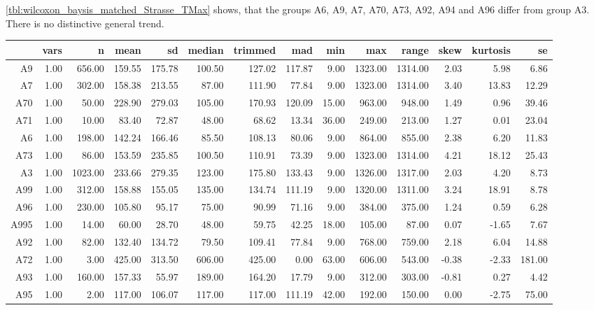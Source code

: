\cref{tbl:wilcoxon_baysis_matched_Strasse_TMax} shows, that the groups A6, A9, A7, A70, A73, A92, A94 and A96 differ from group A3. There is no distinctive general trend.
\begin{table}[ht!]
	\tiny
	\centering
  \begin{tabular}{rrrrrrrrrrrrrr}
    \toprule
    & vars & n & mean & sd & median & trimmed & mad & min & max & range & skew & kurtosis & se \\ 
    \midrule
    A9   & 1.00 & 656.00 & 159.55 & 175.78 & 100.50 & 127.02 & 117.87 & 9.00 & 1323.00 & 1314.00 & 2.03 & 5.98 & 6.86 \\ 
    A7   & 1.00 & 302.00 & 158.38 & 213.55 & 87.00 & 111.90 & 77.84 & 9.00 & 1323.00 & 1314.00 & 3.40 & 13.83 & 12.29 \\ 
    A70  & 1.00 & 50.00 & 228.90 & 279.03 & 105.00 & 170.93 & 120.09 & 15.00 & 963.00 & 948.00 & 1.49 & 0.96 & 39.46 \\ 
    A71  & 1.00 & 10.00 & 83.40 & 72.87 & 48.00 & 68.62 & 13.34 & 36.00 & 249.00 & 213.00 & 1.27 & 0.01 & 23.04 \\ 
    A6   & 1.00 & 198.00 & 142.24 & 166.46 & 85.50 & 108.13 & 80.06 & 9.00 & 864.00 & 855.00 & 2.38 & 6.20 & 11.83 \\ 
    A73  & 1.00 & 86.00 & 153.59 & 235.85 & 100.50 & 110.91 & 73.39 & 9.00 & 1323.00 & 1314.00 & 4.21 & 18.12 & 25.43 \\ 
    A3   & 1.00 & 1023.00 & 233.66 & 279.35 & 123.00 & 175.80 & 133.43 & 9.00 & 1326.00 & 1317.00 & 2.03 & 4.20 & 8.73 \\ 
    A99  & 1.00 & 312.00 & 158.88 & 155.05 & 135.00 & 134.74 & 111.19 & 9.00 & 1320.00 & 1311.00 & 3.24 & 18.91 & 8.78 \\ 
    A96  & 1.00 & 230.00 & 105.80 & 95.17 & 75.00 & 90.99 & 71.16 & 9.00 & 384.00 & 375.00 & 1.24 & 0.59 & 6.28 \\ 
    A995 & 1.00 & 14.00 & 60.00 & 28.70 & 48.00 & 59.75 & 42.25 & 18.00 & 105.00 & 87.00 & 0.07 & -1.65 & 7.67 \\ 
    A92  & 1.00 & 82.00 & 132.40 & 134.72 & 79.50 & 109.41 & 77.84 & 9.00 & 768.00 & 759.00 & 2.18 & 6.04 & 14.88 \\ 
    A72  & 1.00 & 3.00 & 425.00 & 313.50 & 606.00 & 425.00 & 0.00 & 63.00 & 606.00 & 543.00 & -0.38 & -2.33 & 181.00 \\ 
    A93  & 1.00 & 160.00 & 157.33 & 55.97 & 189.00 & 164.20 & 17.79 & 9.00 & 312.00 & 303.00 & -0.81 & 0.27 & 4.42 \\ 
    A95  & 1.00 & 2.00 & 117.00 & 106.07 & 117.00 & 117.00 & 111.19 & 42.00 & 192.00 & 150.00 & 0.00 & -2.75 & 75.00 \\ 

\end{tabular}
\end{table}
